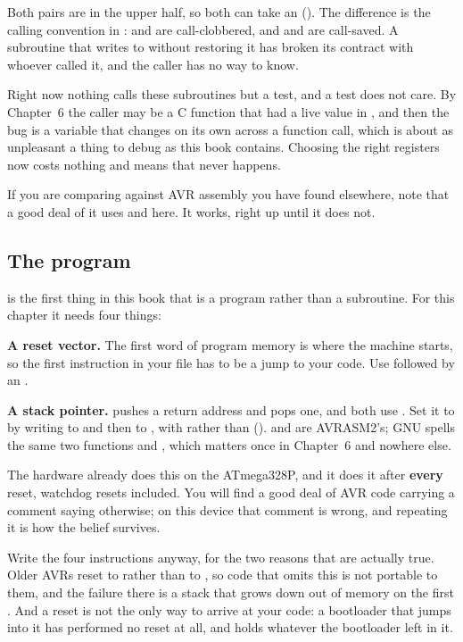 Both pairs are in the upper half, so both can take an  (). The
difference is the calling convention in :  and  are
call-clobbered, and  and  are call-saved. A subroutine that writes to
 without restoring it has broken its contract with whoever called it, and the caller has
no way to know.

Right now nothing calls these subroutines but a test, and a test does not care. By Chapter~6 the
caller may be a C function that had a live value in , and then the bug is a variable
that changes on its own across a function call, which is about as unpleasant a thing to debug as
this book contains. Choosing the right registers now costs nothing and means that never happens.

If you are comparing against AVR assembly you have found elsewhere, note that a good deal of it
uses  and  here. It works, right up until it does not.

\subsection{The program}
\label{c1:sec:program}
 is the first thing in this book that is a program rather than a
subroutine. For this chapter it needs four things:

\textbf{A reset vector.} The first word of program memory is where the machine starts, so the
first instruction in your file has to be a jump to your code. Use  followed by an
.

\textbf{A stack pointer.}  pushes a return address and  pops one, and both
use . Set it to  by writing  to  and then
 to , with  rather than 
().  and  are AVRASM2's; GNU  spells the
same two functions  and , which matters once in Chapter~6 and nowhere
else.

The hardware already does this on the ATmega328P, and it does it after \textbf{every} reset,
watchdog resets included. You will find a good deal of AVR code carrying a comment saying
otherwise; on this device that comment is wrong, and repeating it is how the belief survives.

Write the four instructions anyway, for the two reasons that are actually true. Older AVRs reset
 to  rather than to , so code that omits this is not portable
to them, and the failure there is a stack that grows down out of memory on the first
. And a reset is not the only way to arrive at your code: a bootloader that jumps into
it has performed no reset at all, and  holds whatever the bootloader left in it.

